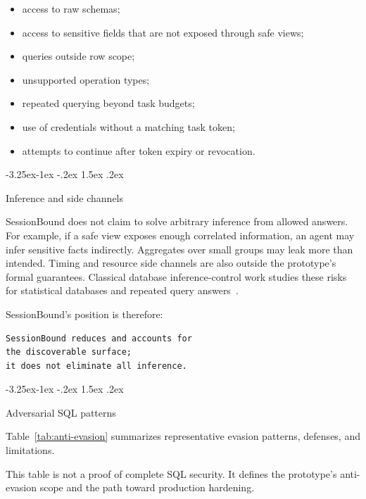 \documentclass[10pt,twocolumn]{article}
\makeatletter
\providecommand{\tightlist}{%
  \setlength{\itemsep}{0pt}\setlength{\parskip}{0pt}}
\renewcommand\subsection{\@startsection{subsection}{2}{\z@}%
  {-3.25ex\@plus -1ex \@minus -.2ex}%
  {1.5ex \@plus .2ex}%
  {\normalfont\large\bfseries\raggedright}}
\makeatother
\begin{document}
\begin{itemize}
\tightlist
\item
  access to raw schemas;
\item
  access to sensitive fields that are not exposed through safe views;
\item
  queries outside row scope;
\item
  unsupported operation types;
\item
  repeated querying beyond task budgets;
\item
  use of credentials without a matching task token;
\item
  attempts to continue after token expiry or revocation.
\end{itemize}

\hypertarget{inference-and-side-channels}{%
\subsection{Inference and side
channels}\label{inference-and-side-channels}}

SessionBound does not claim to solve arbitrary inference from allowed
answers. For example, if a safe view exposes enough correlated
information, an agent may infer sensitive facts indirectly. Aggregates
over small groups may leak more than intended. Timing and resource side
channels are also outside the prototype's formal guarantees.
Classical database inference-control work studies these risks for
statistical databases and repeated query answers~\cite{adam1989securitycontrol}.

SessionBound's position is therefore:

\begin{verbatim}
SessionBound reduces and accounts for
the discoverable surface;
it does not eliminate all inference.
\end{verbatim}

\hypertarget{adversarial-sql-patterns}{%
\subsection{Adversarial SQL
patterns}\label{adversarial-sql-patterns}}

Table~\ref{tab:anti-evasion} summarizes representative evasion
patterns, defenses, and limitations.

This table is not a proof of complete SQL security. It defines the
prototype's anti-evasion scope and the path toward production hardening.
\end{document}
